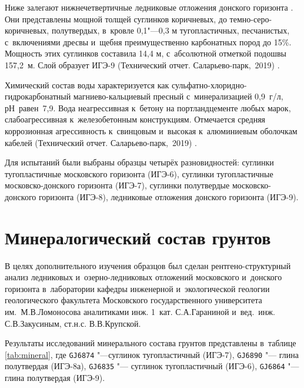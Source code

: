 Ниже залегают нижнечетвертичные ледниковые отложения донского горизонта . 
Они представлены мощной толщей суглинков коричневых, до темно-серо-коричневых, полутвердых, в~кровле 0,1"---0,3 м тугопластичных, песчанистых, с~включениями дресвы и~щебня преимущественно карбонатных пород до 15\%. 
Мощность этих суглинков составила 14,4 м, с~абсолютной отметкой подошвы 157,2~м. 
Слой образует ИГЭ-9 (Технический отчет. Саларьево-парк,~2019) \cite{moshkin2019}.

Химический состав воды характеризуется как сульфатно-хлоридно-гидрокарбонатный магниево-кальциевый пресный с~минерализацией 0,9~г/л, рН~равен~7,9. 
Вода неагрессивная к~бетону на портландцементе любых марок, слабоагрессивная к~железобетонным конструкциям. 
Отмечается средняя коррозионная агрессивность к~свинцовым и~высокая к~алюминиевым оболочкам кабелей (Технический отчет. Саларьево-парк,~2019) \cite{moshkin2019}.


Для испытаний были выбраны образцы четырёх разновидностей: 
суглинки тугопластичные московского горизонта (ИГЭ-6), 
суглинки тугопластичные московско-донского горизонта (ИГЭ-7), 
суглинки полутвердые московско-донского горизонта (ИГЭ-8), 
ледниковые отложения донского горизонта (ИГЭ-9). 




 \section{Минералогический состав грунтов} 

В целях дополнительного изучения образцов был сделан рентгено-структурный анализ 
ледниковых и~озерно-ледниковых отложений московского и~донского горизонта 
в~лаборатории кафедры инженерной и~экологической геологии 
геологического факультета Московского государственного университета им.~М.\:В.\:Ломоносова 
аналитиками инж. 1~кат. С.\:А.\:Гараниной и~вед.~инж. С.\:В.\:Закусиным, ст.\:н.\:с. В.\:В.\:Крупской.


Результаты исследований минерального состава грунтов представлены в~таблице \ref{tab:mineral}, 
где \texttt{GJ6874} "---суглинок тугопластичный (ИГЭ-7), 
\texttt{GJ6890} "--- глина полутвердая (ИГЭ-8а), 
\texttt{GJ6835} "--- суглинок тугопластичный (ИГЭ-6), 
\texttt{GJ6864} "--- глина полутвердая (ИГЭ-9).


